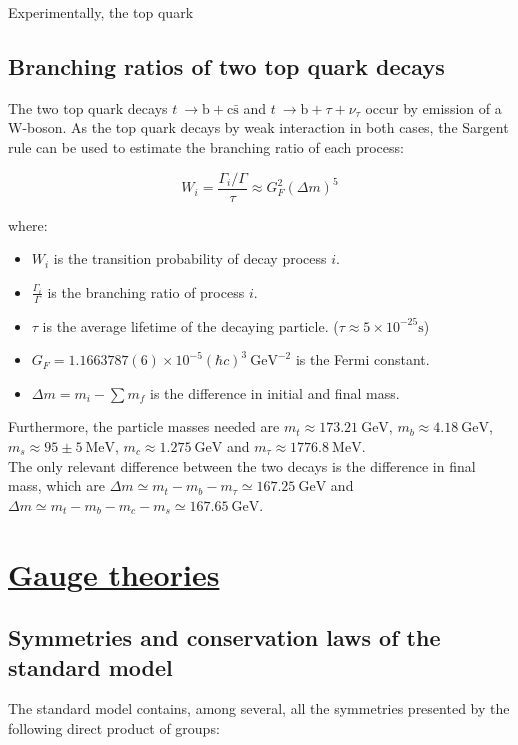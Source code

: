 \documentclass[11pt,a4paper]{article}
\begin{document}
Experimentally, the top quark 

\subsection{Branching ratios of two top quark decays}
The two top quark decays $t\:\rightarrow\text{b}+\text{c}\bar{\text{s}}$ and $t\:\rightarrow\text{b}+\tau+\nu_\tau$ occur by emission of a W-boson. As the top quark decays by weak interaction in both cases, the Sargent rule can be used to estimate the branching ratio of each process:

\begin{equation}
W_i = \frac{\Gamma_i/\Gamma}{\tau} \approx G_F^2 (\Delta m)^5
\end{equation}

where:

\begin{itemize}
	\item $W_i$ is the transition probability of decay process $i$.
	\item $\frac{\Gamma_i}{\Gamma}$ is the branching ratio of process $i$.
	\item $\tau$ is the average lifetime of the decaying particle. ($\tau \approx 5\times10^{-25}\text{s}$)
	\item $G_F = 1.1663787(6)\times 10^{-5}(\hbar c)^3\:\text{GeV}^{-2}$ is the Fermi constant.
	\item $\Delta m = m_i - \sum m_f$ is the difference in initial and final mass.
\end{itemize}

Furthermore, the particle masses needed are $m_t \approx 173.21\:\text{GeV}$, $m_b \approx 4.18\:\text{GeV}$, $m_s \approx 95 \pm 5 \:\text{MeV}$, $m_c \approx 1.275\:\text{GeV}$ and $m_\tau \approx 1776.8\:\text{MeV}$.\\
The only relevant difference between the two decays is the difference in final mass, which are $\Delta m \simeq m_t - m_b - m_\tau \simeq 167.25\:\text{GeV}$ and $\Delta m \simeq m_t - m_b - m_c - m_s \simeq 167.65\:\text{GeV}$.

\section{\underline{Gauge theories}}
\subsection{Symmetries and conservation laws of the standard model}
The standard model contains, among several, all the symmetries presented by the following direct product of groups:
\end{document}
